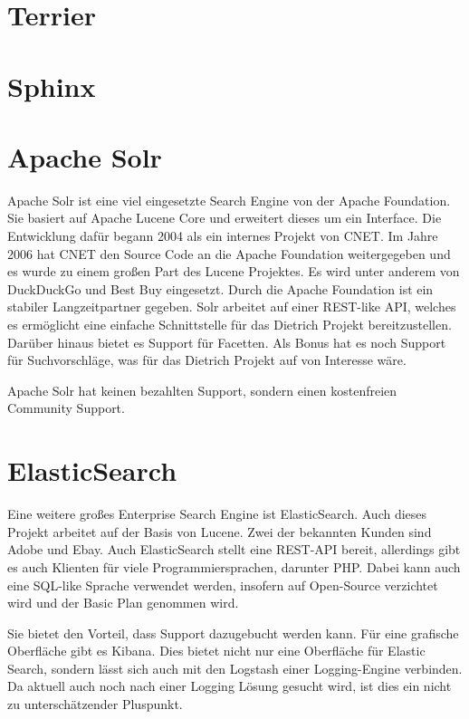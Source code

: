 \cite{TheApacheSoftwareFoundation.2019b}

\section{Terrier}


\section{Sphinx}
\label{sphinx}


\section{Apache Solr}

Apache Solr ist eine viel eingesetzte Search Engine von der Apache Foundation. Sie basiert auf Apache Lucene Core und erweitert dieses um ein Interface. Die Entwicklung dafür begann 2004 als ein internes Projekt von CNET. Im Jahre 2006 hat CNET den Source Code an die Apache Foundation weitergegeben und es wurde zu einem großen Part des Lucene Projektes. Es wird unter anderem von DuckDuckGo und Best Buy eingesetzt. Durch die Apache Foundation ist ein stabiler Langzeitpartner gegeben. 
Solr arbeitet auf einer REST-like API, welches es ermöglicht eine einfache Schnittstelle für das Dietrich Projekt bereitzustellen. Darüber hinaus bietet es Support für Facetten.
Als Bonus hat es noch Support für Suchvorschläge, was für das Dietrich Projekt auf von Interesse wäre.

Apache Solr hat keinen bezahlten Support, sondern einen kostenfreien Community Support.

\cite{TheApacheSoftwareFoundation.2019}

\section{ElasticSearch}

Eine weitere großes Enterprise Search Engine ist ElasticSearch. Auch dieses Projekt arbeitet auf der Basis von Lucene. Zwei der bekannten Kunden sind Adobe und Ebay. Auch ElasticSearch stellt eine REST-API bereit, allerdings gibt es auch Klienten für viele Programmiersprachen, darunter PHP. Dabei kann auch eine SQL-like Sprache verwendet werden, insofern auf Open-Source verzichtet wird und der Basic Plan genommen wird. \cite{ElasticSearchSub.2019}

Sie bietet den Vorteil, dass Support dazugebucht werden kann. Für eine grafische Oberfläche gibt es Kibana. Dies bietet nicht nur eine Oberfläche für Elastic Search, sondern lässt sich auch mit den Logstash einer Logging-Engine verbinden. Da aktuell auch noch nach einer Logging Lösung gesucht wird, ist dies ein nicht zu unterschätzender Pluspunkt. 

